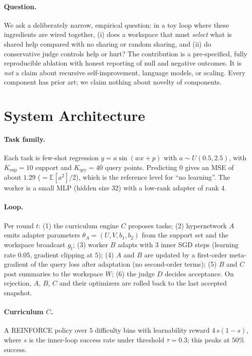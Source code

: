 \documentclass[11pt]{article}
\begin{document}
\paragraph{Question.} We ask a deliberately narrow, empirical question: in a toy loop where these ingredients are wired together,
(i) does a workspace that must \emph{select} what is shared help compared with no sharing or random sharing, and
(ii) do conservative judge controls help or hurt? The contribution is a pre-specified, fully reproducible ablation
with honest reporting of null and negative outcomes. It is \emph{not} a claim about recursive self-improvement, language models,
or scaling. Every component has prior art; we claim nothing about novelty of components.

\section{System Architecture}

\paragraph{Task family.} Each task is few-shot regression $y=a\sin(wx+p)$ with $a\sim U(0.5,2.5)$, with $K_{\text{sup}}=10$ support and
$K_{\text{qry}}=40$ query points. Predicting $0$ gives an MSE of about $1.29$ ($=\mathbb{E}[a^2]/2$), which is the reference level for ``no learning''.
The worker is a small MLP (hidden size $32$) with a low-rank adapter of rank $4$.

\paragraph{Loop.} Per round $t$: (1) the curriculum engine $C$ proposes tasks; (2) hypernetwork $A$ emits adapter parameters $\theta_A=(U,V,b_1,b_2)$ from the support set and
the workspace broadcast $g_t$; (3) worker $B$ adapts with $3$ inner SGD steps (learning rate $0.05$, gradient clipping at $5$);
(4) $A$ and $B$ are updated by a first-order meta-gradient of the query loss after adaptation (no second-order terms);
(5) $B$ and $C$ post summaries to the workspace $W$; (6) the judge $D$ decides acceptance.
On rejection, $A$, $B$, $C$ and their optimizers are rolled back to the last accepted snapshot.

\paragraph{Curriculum $C$.} A REINFORCE policy over $5$ difficulty bins with learnability reward $4\,s(1-s)$, where $s$ is the inner-loop success rate
under threshold $\tau=0.3$; this peaks at $50\%$ success.
\end{document}
